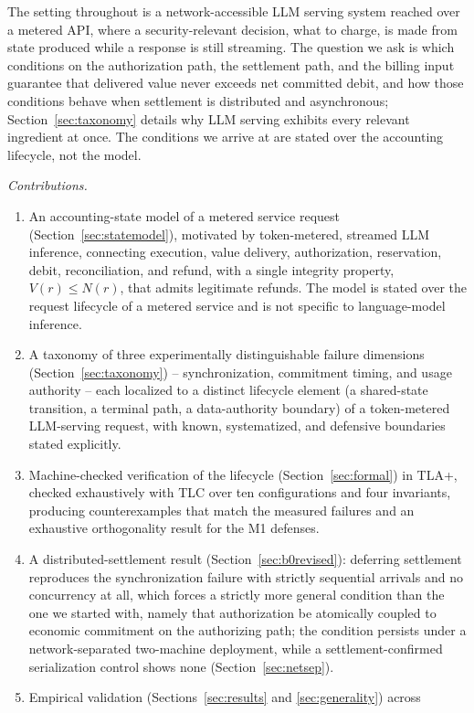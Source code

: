 \documentclass[manuscript,review,anonymous]{acmart}
\begin{document}
The setting throughout is a network-accessible LLM serving system reached over a metered
API, where a security-relevant decision, what to charge, is made from state produced
while a response is still streaming. The question we ask is which conditions on the
authorization path, the settlement path, and the billing input guarantee that delivered
value never exceeds net committed debit, and how those conditions behave when settlement
is distributed and asynchronous; Section~\ref{sec:taxonomy} details why LLM serving
exhibits every relevant ingredient at once. The conditions we arrive at are stated over
the accounting lifecycle, not the model.

\textit{Contributions.}
\begin{enumerate}
\item An accounting-state model of a metered service request
(Section~\ref{sec:statemodel}), motivated by token-metered, streamed LLM inference,
connecting execution, value delivery, authorization,
reservation, debit, reconciliation, and refund, with a single integrity property,
$V(r) \le N(r)$, that admits legitimate refunds. The model is stated over the request
lifecycle of a metered service and is not specific to language-model inference.
\item A taxonomy of three experimentally distinguishable failure dimensions
(Section~\ref{sec:taxonomy}) -- synchronization, commitment timing, and usage authority --
each localized to a distinct lifecycle element (a shared-state transition, a terminal
path, a data-authority boundary) of a token-metered LLM-serving request, with known,
systematized, and defensive boundaries stated explicitly.
\item Machine-checked verification of the lifecycle (Section~\ref{sec:formal}) in TLA+,
checked exhaustively with TLC over ten configurations and four invariants, producing
counterexamples that match the measured failures and an exhaustive orthogonality result
for the M1 defenses.
\item A distributed-settlement result (Section~\ref{sec:b0revised}): deferring settlement
reproduces the synchronization failure with strictly sequential arrivals and no
concurrency at all, which forces a strictly more general condition than the one we
started with, namely that authorization be atomically coupled to economic commitment on
the authorizing path; the condition persists under a network-separated two-machine
deployment, while a settlement-confirmed serialization control shows none
(Section~\ref{sec:netsep}).
\item Empirical validation (Sections~\ref{sec:results} and \ref{sec:generality}) across

\end{enumerate}
\end{document}
